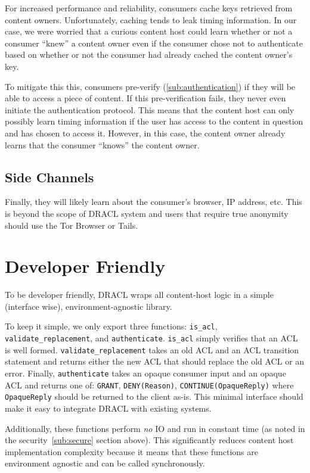 \documentclass[pdftex,12pt,a4papaer]{report}
\begin{document}
For increased performance and reliability, consumers cache keys retrieved from
content owners. Unfortunately, caching tends to leak timing information. In our
case, we were worried that a curious content host could learn whether or not a
consumer ``knew'' a content owner even if the consumer chose not to authenticate
based on whether or not the consumer had already cached the content owner's key.

To mitigate this this, consumers pre-verify (\ref{sub:authentication}) if they
will be able to access a piece of content. If this pre-verification fails, they
never even initiate the authentication protocol. This means that the content
host can only possibly learn timing information if the user has access to the
content in question and has chosen to access it. However, in this case, the
content owner already learns that the consumer ``knows'' the content owner.

\subsection{Side Channels}

Finally, they will likely learn about the consumer's browser, IP address, etc.
This is beyond the scope of DRACL system and users that require true anonymity
should use the Tor Browser\cite{tor} or Tails\cite{tails}.

\section{Developer Friendly}

To be developer friendly, DRACL wraps all content-host logic in a simple
(interface wise), environment-agnostic library.

To keep it simple, we only export three functions: \verb=is_acl=,
\verb=validate_replacement=, and \verb=authenticate=. \verb=is_acl= simply
verifies that an ACL is well formed. \verb=validate_replacement= takes an old
ACL and an ACL transition statement and returns either the new ACL that should
replace the old ACL or an error. Finally, \verb=authenticate= takes an opaque
consumer input and an opaque ACL and returns one of: \verb=GRANT=,
\verb=DENY(Reason)=, \verb=CONTINUE(OpaqueReply)= where \verb=OpaqueReply=
should be returned to the client as-is. This minimal interface should make it
easy to integrate DRACL with existing systems.

Additionally, these functions perform \emph{no} IO and run in constant time (as
noted in the security~\ref{sub:secure} section above). This significantly
reduces content host implementation complexity because it means that these
functions are environment agnostic and can be called synchronously.
\end{document}

